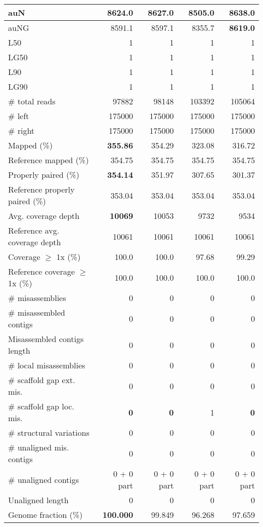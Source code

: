 \documentclass[12pt,a4paper]{article}
\begin{document}
\begin{table}[ht]
\begin{center}
\begin{tabular}{|l*{4}{|r}|}
auN & 8624.0 & 8627.0 & 8505.0 & {\bf 8638.0} \\ \hline
auNG & 8591.1 & 8597.1 & 8355.7 & {\bf 8619.0} \\ \hline
L50 & 1 & 1 & 1 & 1 \\ \hline
LG50 & 1 & 1 & 1 & 1 \\ \hline
L90 & 1 & 1 & 1 & 1 \\ \hline
LG90 & 1 & 1 & 1 & 1 \\ \hline
\# total reads & 97882 & 98148 & 103392 & 105064 \\ \hline
\# left & 175000 & 175000 & 175000 & 175000 \\ \hline
\# right & 175000 & 175000 & 175000 & 175000 \\ \hline
Mapped (\%) & {\bf 355.86} & 354.29 & 323.08 & 316.72 \\ \hline
Reference mapped (\%) & 354.75 & 354.75 & 354.75 & 354.75 \\ \hline
Properly paired (\%) & {\bf 354.14} & 351.97 & 307.65 & 301.37 \\ \hline
Reference properly paired (\%) & 353.04 & 353.04 & 353.04 & 353.04 \\ \hline
Avg. coverage depth & {\bf 10069} & 10053 & 9732 & 9534 \\ \hline
Reference avg. coverage depth & 10061 & 10061 & 10061 & 10061 \\ \hline
Coverage $\geq$ 1x (\%) & 100.0 & 100.0 & 97.68 & 99.29 \\ \hline
Reference coverage $\geq$ 1x (\%) & 100.0 & 100.0 & 100.0 & 100.0 \\ \hline
\# misassemblies & 0 & 0 & 0 & 0 \\ \hline
\# misassembled contigs & 0 & 0 & 0 & 0 \\ \hline
Misassembled contigs length & 0 & 0 & 0 & 0 \\ \hline
\# local misassemblies & 0 & 0 & 0 & 0 \\ \hline
\# scaffold gap ext. mis. & 0 & 0 & 0 & 0 \\ \hline
\# scaffold gap loc. mis. & {\bf 0} & {\bf 0} & 1 & {\bf 0} \\ \hline
\# structural variations & 0 & 0 & 0 & 0 \\ \hline
\# unaligned mis. contigs & 0 & 0 & 0 & 0 \\ \hline
\# unaligned contigs & 0 + 0 part & 0 + 0 part & 0 + 0 part & 0 + 0 part \\ \hline
Unaligned length & 0 & 0 & 0 & 0 \\ \hline
Genome fraction (\%) & {\bf 100.000} & 99.849 & 96.268 & 97.659 \\ \hline

\end{tabular}
\end{center}
\end{table}
\end{document}
